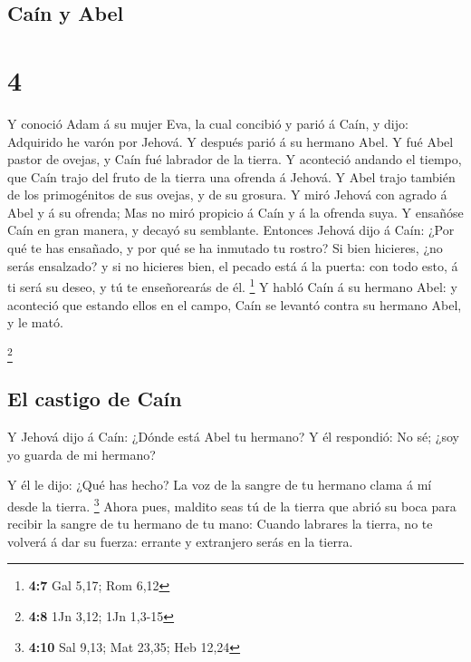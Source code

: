 \hypertarget{cauxedn-y-abel}{%
\subsection{Caín y Abel}\label{cauxedn-y-abel}}

\hypertarget{section-3}{%
\section{4}\label{section-3}}

 Y conoció Adam á su mujer Eva, la cual concibió y parió á
Caín, y dijo: Adquirido he varón por Jehová.  Y después
parió á su hermano Abel. Y fué Abel pastor de ovejas, y Caín fué
labrador de la tierra.  Y aconteció andando el tiempo, que
Caín trajo del fruto de la tierra una ofrenda á Jehová.  Y
Abel trajo también de los primogénitos de sus ovejas, y de su grosura. Y
miró Jehová con agrado á Abel y á su ofrenda;  Mas no miró
propicio á Caín y á la ofrenda suya. Y ensañóse Caín en gran manera, y
decayó su semblante.  Entonces Jehová dijo á Caín: ¿Por
qué te has ensañado, y por qué se ha inmutado tu rostro? 
Si bien hicieres, ¿no serás ensalzado? y si no hicieres bien, el pecado
está á la puerta: con todo esto, á ti será su deseo, y tú te
enseñorearás de él. \footnote{\textbf{4:7} Gal 5,17; Rom 6,12}
 Y habló Caín á su hermano Abel: y aconteció que estando
ellos en el campo, Caín se levantó contra su hermano Abel, y le mató.

\footnote{\textbf{4:8} 1Jn 3,12; 1Jn 1,3-15}

\hypertarget{el-castigo-de-cauxedn}{%
\subsection{El castigo de Caín}\label{el-castigo-de-cauxedn}}

 Y Jehová dijo á Caín: ¿Dónde está Abel tu hermano? Y él
respondió: No sé; ¿soy yo guarda de mi hermano?

 Y él le dijo: ¿Qué has hecho? La voz de la sangre de tu
hermano clama á mí desde la tierra. \footnote{\textbf{4:10} Sal 9,13;
  Mat 23,35; Heb 12,24}  Ahora pues, maldito seas tú de
la tierra que abrió su boca para recibir la sangre de tu hermano de tu
mano:  Cuando labrares la tierra, no te volverá á dar su
fuerza: errante y extranjero serás en la tierra.

